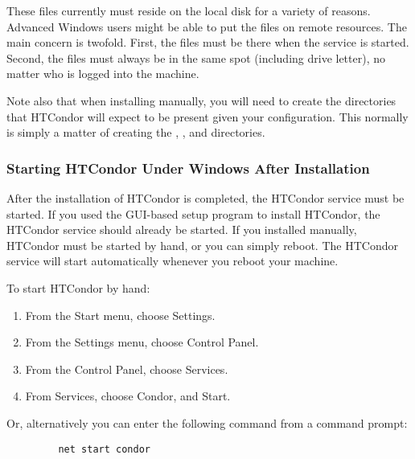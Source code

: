 \begin{description}
These files currently must reside on the local disk for a variety of reasons.
Advanced Windows users might be able to put the files on remote resources.
The main concern is twofold.  First, the files must be there when the service
is started.  Second, the files must always be in the same spot (including
drive letter), no matter who is logged into the machine.  

Note also that when installing manually, you will need to create the
directories that HTCondor will expect to be present given your
configuration. This normally is simply a matter of creating the
, , and  directories.

\end{description}


\subsubsection{\label{nt-installed-now-what}
Starting HTCondor Under Windows After Installation}

After the installation of HTCondor is completed, the HTCondor service
must be started.  If you used the GUI-based setup program to install
HTCondor, the HTCondor service should already be started.  If you installed
manually, HTCondor must
be started by hand, or you can simply reboot. \Note The HTCondor service
will start automatically whenever you reboot your machine.

To start HTCondor by hand:
\begin{enumerate}
\item From the Start menu, choose Settings.
\item From the Settings menu, choose Control Panel.
\item From the Control Panel, choose Services.
\item From Services, choose Condor, and Start.
\end{enumerate}

Or, alternatively you can enter the following command from a command prompt:
\begin{verbatim}
         net start condor
\end{verbatim}

